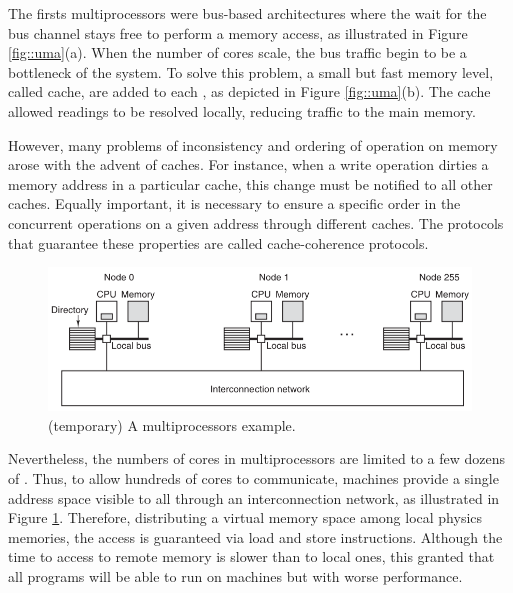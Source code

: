 			The firsts \uma multiprocessors were bus-based architectures where
			the \cpu wait for the bus channel stays free to perform a memory
			access, as illustrated in Figure \ref{fig::uma}(a).
			When the number of cores scale, the bus traffic begin to be a
			bottleneck of the system.
			To solve this problem, a small but fast memory level, called cache,
			are added to each \cpu, as depicted in Figure \ref{fig::uma}(b).
			The cache allowed readings to be resolved locally, reducing traffic
			to the main memory.

			However, many problems of inconsistency and ordering of operation
			on memory arose with the advent of caches.
			For instance, when a write operation dirties a memory address in
			a particular cache, this change must be notified to all other caches.
			Equally important, it is necessary to ensure a specific order in
			the concurrent operations on a given address through different caches.
			The protocols that guarantee these properties are called cache-coherence protocols.

			\begin{figure}[h]
				\centering
				\includegraphics[width=.8\textwidth]{images/numa.png}

				\caption{
					(temporary) A \numa multiprocessors example.
				}\par
				\label{fig::numa}
			\end{figure}

			Nevertheless, the numbers of cores in \uma multiprocessors are limited
			to a few dozens of \cpus.
			Thus, to allow hundreds of cores to communicate, \numa machines provide
			a single address space visible to all \cpus through an interconnection
			network,  as illustrated in Figure \ref{fig::numa}.
			Therefore, distributing a virtual memory space among local physics memories,
			the access is guaranteed via load and store instructions.
			Although the time to access to remote memory is slower than to local ones,
			this granted that all \uma programs will be able to run on \numa machines
			but with worse performance.


